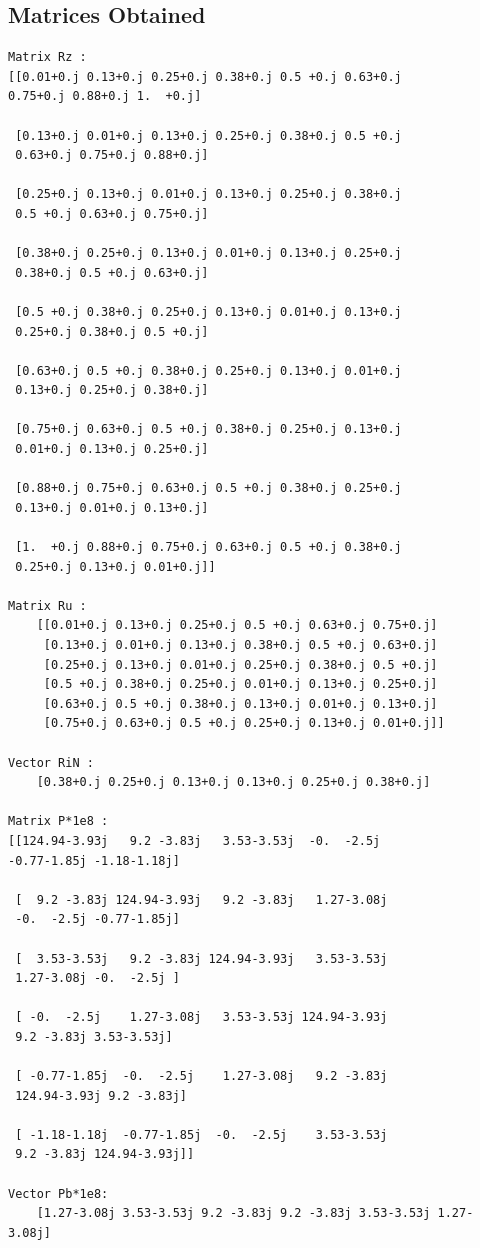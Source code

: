 \documentclass[11pt, a4paper]{article}
\begin{document}
\subsection{Matrices Obtained}
\begin{lstlisting}	
Matrix Rz :
[[0.01+0.j 0.13+0.j 0.25+0.j 0.38+0.j 0.5 +0.j 0.63+0.j
0.75+0.j 0.88+0.j 1.  +0.j]

 [0.13+0.j 0.01+0.j 0.13+0.j 0.25+0.j 0.38+0.j 0.5 +0.j
 0.63+0.j 0.75+0.j 0.88+0.j]
 
 [0.25+0.j 0.13+0.j 0.01+0.j 0.13+0.j 0.25+0.j 0.38+0.j 
 0.5 +0.j 0.63+0.j 0.75+0.j]
 
 [0.38+0.j 0.25+0.j 0.13+0.j 0.01+0.j 0.13+0.j 0.25+0.j 
 0.38+0.j 0.5 +0.j 0.63+0.j]
 
 [0.5 +0.j 0.38+0.j 0.25+0.j 0.13+0.j 0.01+0.j 0.13+0.j
 0.25+0.j 0.38+0.j 0.5 +0.j]
 
 [0.63+0.j 0.5 +0.j 0.38+0.j 0.25+0.j 0.13+0.j 0.01+0.j
 0.13+0.j 0.25+0.j 0.38+0.j]
 
 [0.75+0.j 0.63+0.j 0.5 +0.j 0.38+0.j 0.25+0.j 0.13+0.j
 0.01+0.j 0.13+0.j 0.25+0.j]
 
 [0.88+0.j 0.75+0.j 0.63+0.j 0.5 +0.j 0.38+0.j 0.25+0.j
 0.13+0.j 0.01+0.j 0.13+0.j]
 
 [1.  +0.j 0.88+0.j 0.75+0.j 0.63+0.j 0.5 +0.j 0.38+0.j
 0.25+0.j 0.13+0.j 0.01+0.j]]
 
Matrix Ru :
    [[0.01+0.j 0.13+0.j 0.25+0.j 0.5 +0.j 0.63+0.j 0.75+0.j]
     [0.13+0.j 0.01+0.j 0.13+0.j 0.38+0.j 0.5 +0.j 0.63+0.j]
     [0.25+0.j 0.13+0.j 0.01+0.j 0.25+0.j 0.38+0.j 0.5 +0.j]
     [0.5 +0.j 0.38+0.j 0.25+0.j 0.01+0.j 0.13+0.j 0.25+0.j]
     [0.63+0.j 0.5 +0.j 0.38+0.j 0.13+0.j 0.01+0.j 0.13+0.j]
     [0.75+0.j 0.63+0.j 0.5 +0.j 0.25+0.j 0.13+0.j 0.01+0.j]]
     
Vector RiN :
    [0.38+0.j 0.25+0.j 0.13+0.j 0.13+0.j 0.25+0.j 0.38+0.j]
    
Matrix P*1e8 : 
[[124.94-3.93j   9.2 -3.83j   3.53-3.53j  -0.  -2.5j
-0.77-1.85j -1.18-1.18j]

 [  9.2 -3.83j 124.94-3.93j   9.2 -3.83j   1.27-3.08j
 -0.  -2.5j -0.77-1.85j]
 
 [  3.53-3.53j   9.2 -3.83j 124.94-3.93j   3.53-3.53j
 1.27-3.08j -0.  -2.5j ]
 
 [ -0.  -2.5j    1.27-3.08j   3.53-3.53j 124.94-3.93j
 9.2 -3.83j 3.53-3.53j]
 
 [ -0.77-1.85j  -0.  -2.5j    1.27-3.08j   9.2 -3.83j
 124.94-3.93j 9.2 -3.83j]
 
 [ -1.18-1.18j  -0.77-1.85j  -0.  -2.5j    3.53-3.53j
 9.2 -3.83j 124.94-3.93j]]
 
Vector Pb*1e8:
    [1.27-3.08j 3.53-3.53j 9.2 -3.83j 9.2 -3.83j 3.53-3.53j 1.27-3.08j]

\end{lstlisting}
\newpage
\end{document}
